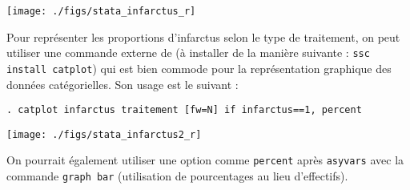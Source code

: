 \texttt{[image: ./figs/stata\_infarctus\_r]}

Pour représenter les proportions d'infarctus selon le type de traitement, on
peut utiliser une commande externe de \Stata (à installer de la manière
suivante : \verb|ssc install catplot|) qui est bien commode pour la
représentation graphique des données catégorielles. Son usage est le suivant :
\begin{verbatim}
. catplot infarctus traitement [fw=N] if infarctus==1, percent
\end{verbatim}

\texttt{[image: ./figs/stata\_infarctus2\_r]}

On pourrait également utiliser une option comme \texttt{percent} après
\texttt{asyvars} avec la commande \texttt{graph bar} (utilisation de
pourcentages au lieu d'effectifs). 

